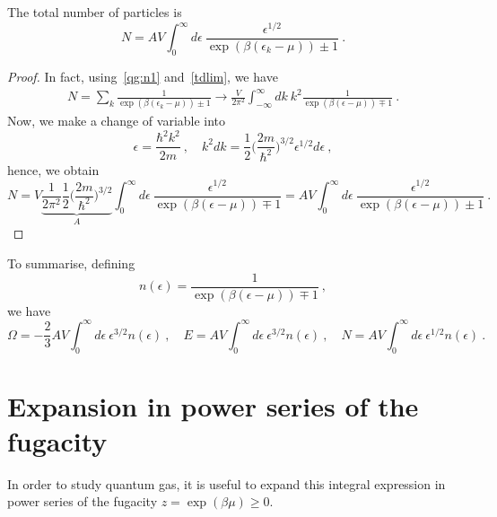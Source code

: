     The total number of particles is 
    \begin{equation}\label{qg:n2}
        N = A V \int_0^\infty d\epsilon ~ \frac{\epsilon^{1/2}}{\exp(\beta(\epsilon_k - \mu)) \pm 1}  ~.
    \end{equation}
    \begin{proof}
        In fact, using~\eqref{qg:n1} and~\eqref{tdlim}, we have 
        \begin{equation*}
        \begin{aligned}
            N = \sum_k \frac{1}{\exp(\beta(\epsilon_k - \mu)) \pm 1} \rightarrow \frac{V}{2\pi^2} \int_{-\infty}^\infty dk~ k^2 \frac{1}{\exp(\beta(\epsilon - \mu)) \mp 1} ~.
        \end{aligned}
        \end{equation*}
        Now, we make a change of variable into
        \begin{equation*}
            \epsilon = \frac{\hbar^2 k^2}{2m} ~, \quad k^2 dk = \frac{1}{2} \Big (\frac{2m}{\hbar^2}\Big)^{3/2} \epsilon^{1/2} d\epsilon ~,
        \end{equation*}
        hence, we obtain
        \begin{equation*}
            N = V \underbrace{ \frac{1}{2\pi^2} \frac{1}{2} \Big (\frac{2m}{\hbar^2}\Big)^{3/2}}_A \int_0^\infty d\epsilon ~ \frac{\epsilon^{1/2}}{\exp(\beta(\epsilon - \mu)) \mp 1} = A V \int_0^\infty d\epsilon ~ \frac{\epsilon^{1/2}}{\exp(\beta(\epsilon - \mu)) \pm 1} ~.
        \end{equation*}
    \end{proof}

    To summarise, defining 
    \begin{equation*}
        n (\epsilon) = \frac{1}{\exp(\beta(\epsilon - \mu)) \mp 1} ~,
    \end{equation*}
    we have 
    \begin{equation*}
        \Omega = - \frac{2}{3} A V \int_0^\infty d\epsilon ~ \epsilon^{3/2} n(\epsilon) ~, \quad E = A V \int_0^\infty d\epsilon ~ \epsilon^{3/2} n(\epsilon) ~, \quad N = A V \int_0^\infty d\epsilon ~ \epsilon^{1/2} n(\epsilon) ~.
    \end{equation*}

\section{Expansion in power series of the fugacity}

    In order to study quantum gas, it is useful to expand this integral expression in power series of the fugacity $z = \exp(\beta \mu) \geq 0$. 

